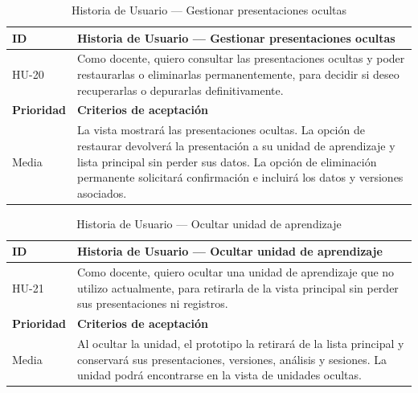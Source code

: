 \documentclass[11pt]{article}
\begin{document}
\begin{table}[H]
    \centering
    \renewcommand{\arraystretch}{1.2}
    \begin{tabular}{|p{2.5cm}|p{11cm}|}
        \hline
        \textbf{ID} & \textbf{Historia de Usuario --- Gestionar presentaciones ocultas} \\
        \hline
        HU-20 & Como docente, quiero consultar las presentaciones ocultas y poder restaurarlas o eliminarlas permanentemente, para decidir si deseo recuperarlas o depurarlas definitivamente. \\
        \hline
        \textbf{Prioridad} & \textbf{Criterios de aceptación} \\
        \hline
        Media & La vista mostrará las presentaciones ocultas. La opción de restaurar devolverá la presentación a su unidad de aprendizaje y lista principal sin perder sus datos. La opción de eliminación permanente solicitará confirmación e incluirá los datos y versiones asociados. \\
        \hline
    \end{tabular}
    \caption{Historia de Usuario --- Gestionar presentaciones ocultas}
    \label{tab:hu-gestionar-presentaciones-ocultas}
\end{table}

\begin{table}[H]
    \centering
    \renewcommand{\arraystretch}{1.2}
    \begin{tabular}{|p{2.5cm}|p{11cm}|}
        \hline
        \textbf{ID} & \textbf{Historia de Usuario --- Ocultar unidad de aprendizaje} \\
        \hline
        HU-21 & Como docente, quiero ocultar una unidad de aprendizaje que no utilizo actualmente, para retirarla de la vista principal sin perder sus presentaciones ni registros. \\
        \hline
        \textbf{Prioridad} & \textbf{Criterios de aceptación} \\
        \hline
        Media & Al ocultar la unidad, el prototipo la retirará de la lista principal y conservará sus presentaciones, versiones, análisis y sesiones. La unidad podrá encontrarse en la vista de unidades ocultas. \\
        \hline
    \end{tabular}
    \caption{Historia de Usuario --- Ocultar unidad de aprendizaje}
    \label{tab:hu-ocultar-unidad}
\end{table}
\end{document}
